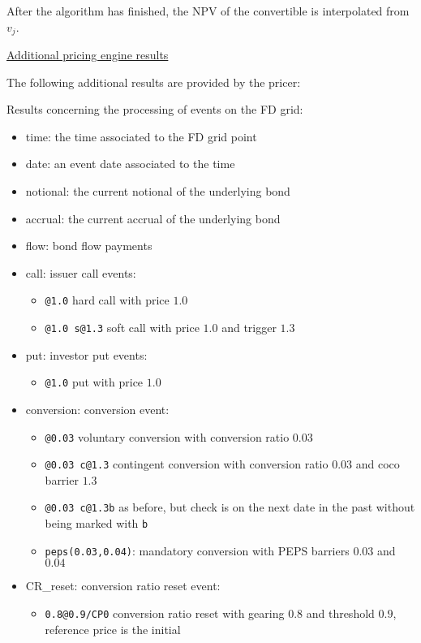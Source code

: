{After the algorithm has finished, the NPV of the convertible is interpolated from $v_j$.

\underline{Additional pricing engine results}

The following additional results are provided by the pricer:

Results concerning the processing of events on the FD grid: 

\begin{itemize}
\item time: the time associated to the FD grid point
\item date: an event date associated to the time
\item notional: the current notional of the underlying bond
\item accrual: the current accrual of the underlying bond
\item flow: bond flow payments
\item call: issuer call events:
  \begin{itemize}
  \item \verb+@1.0+ hard call with price $1.0$
  \item \verb+@1.0 s@1.3+ soft call with price $1.0$ and trigger $1.3$
  \end{itemize}
\item put: investor put events:
  \begin{itemize}
  \item \verb+@1.0+ put with price $1.0$
  \end{itemize}
\item conversion: conversion event:
  \begin{itemize}
  \item \verb+@0.03+ voluntary conversion with conversion ratio $0.03$
  \item \verb+@0.03 c@1.3+ contingent conversion with conversion ratio $0.03$ and coco barrier $1.3$
  \item \verb+@0.03 c@1.3b+ as before, but check is on the next date in the past without being marked with \verb+b+
  \item \verb+peps(0.03,0.04)+: mandatory conversion with PEPS barriers $0.03$ and $0.04$ 
  \end{itemize}
\item CR\_reset: conversion ratio reset event:
  \begin{itemize}
  \item \verb+0.8@0.9/CP0+ conversion ratio reset with gearing $0.8$ and threshold $0.9$, reference price is the initial

\end{itemize}
\end{itemize}}
